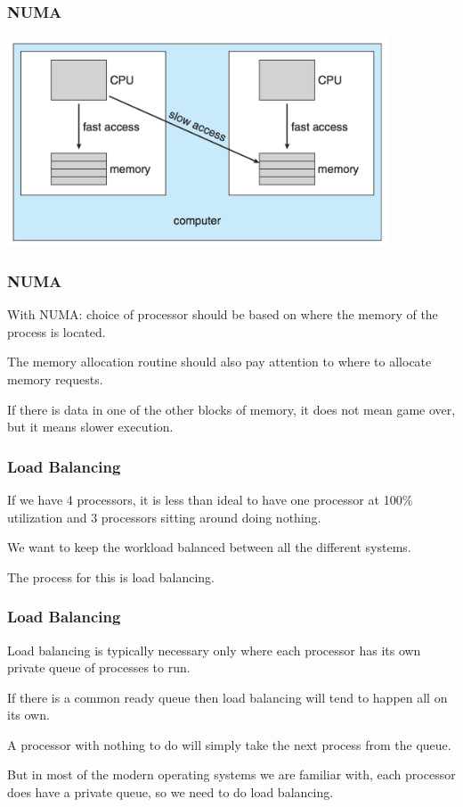 \begin{frame}
\frametitle{NUMA}

\begin{center}
	\includegraphics[width=0.85\textwidth]{images/numa.png}
\end{center}

\end{frame}

\begin{frame}
\frametitle{NUMA}

With NUMA: choice of processor should be based on where the memory of the process is located.

The memory allocation routine should also pay attention to where to allocate memory requests.
  
If there is data in one of the other blocks of memory, it does not mean game over, but it means slower execution.

\end{frame}

\begin{frame}
\frametitle{Load Balancing}

If we have 4 processors, it is less than ideal to have one processor at 100\% utilization and 3 processors sitting around doing nothing. 

We want to keep the workload balanced between all the different systems. 

The process for this is \alert{load balancing}.

\end{frame}

\begin{frame}
\frametitle{Load Balancing}

Load balancing is typically necessary only where each processor has its own private queue of processes to run. 

If there is a common ready queue then load balancing will tend to happen all on its own.

A processor with nothing to do will simply take the next process from the queue. 

But in most of the modern operating systems we are familiar with, each processor does have a private queue, so we need to do load balancing.

\end{frame}

